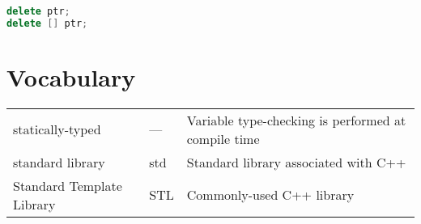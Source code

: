 \documentclass[10pt]{article}
\begin{document}
\begin{lstlisting}[language=C++]
delete ptr;
delete [] ptr;
\end{lstlisting}

\section{Vocabulary}

\begin{tabular}{l l l}
statically-typed & --- & Variable type-checking is performed at compile time\\
standard library & std & Standard library associated with C++\\
Standard Template Library & STL & Commonly-used C++ library\\
\end{tabular}
\end{document}
